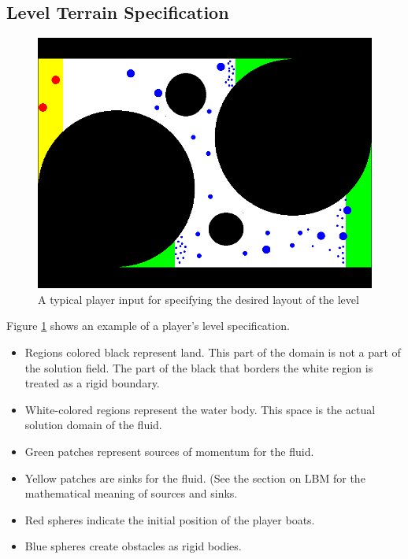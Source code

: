 \subsection{Level Terrain Specification}

\begin{figure}
\centering
  \includegraphics[scale=0.4]{img/ImageProcessing/LevelImages/img_0.png}
\caption{A typical player input for specifying the desired layout of the level\label{fig:LevelInput}}
\end{figure}

Figure \ref{fig:LevelInput} shows an example of a player's level specification.
\begin{itemize}
	\item Regions colored black represent land. This part of the domain is not a part of the solution field. The part of the black that borders the white region is treated as a rigid boundary.
	\item White-colored regions represent the water body. This space is the actual solution domain of the fluid.
	\item Green patches represent sources of momentum for the fluid.
	\item Yellow patches are sinks for the fluid. (See the section on LBM for the mathematical meaning of sources and sinks.
	\item Red spheres indicate the initial position of the player boats.
	\item Blue spheres create obstacles as rigid bodies.
\end{itemize}
